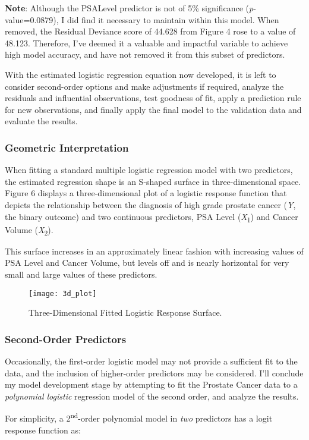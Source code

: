 \textbf{Note}: Although the PSALevel predictor is not of 5\% significance (\textit{p}-value=0.0879), I did find it necessary to maintain within this model. When removed, the Residual Deviance score of 44.628 from Figure 4 rose to a value of 48.123. Therefore, I've deemed it a valuable and impactful variable to achieve high model accuracy, and have not removed it from this subset of predictors. \par
With the estimated logistic regression equation now developed, it is left to consider second-order options and make adjustments if required, analyze the residuals and influential observations, test goodness of fit, apply a prediction rule for new observations, and finally apply the final model to the validation data and evaluate the results.

\subsubsection{Geometric Interpretation}
When fitting a standard multiple logistic regression model with two predictors, the estimated regression shape is an S-shaped surface in three-dimensional space. Figure 6 displays a three-dimensional plot of a logistic response function that depicts the relationship between the diagnosis of high grade prostate cancer (\textit{Y}, the binary outcome) and two continuous predictors, PSA Level (\textit{X}\textsubscript{1}) and Cancer Volume (\textit{X}\textsubscript{2}). \par
This surface increases in an approximately linear fashion with increasing values of PSA Level and Cancer Volume, but levels off and is nearly horizontal for very small and large values of these predictors.

\begin{figure}[H]
	\centering
	\texttt{[image: 3d\_plot]}
	\caption{Three-Dimensional Fitted Logistic Response Surface.}
\end{figure}

\subsubsection{Second-Order Predictors}
Occasionally, the first-order logistic model may not provide a sufficient fit to the data, and the inclusion of higher-order predictors may be considered. I'll conclude my model development stage by attempting to fit the Prostate Cancer data to a \textit{polynomial logistic} regression model of the second order, and analyze the results. \par 
For simplicity, a 2\textsuperscript{nd}-order polynomial model in \textit{two} predictors has a logit response function as:

